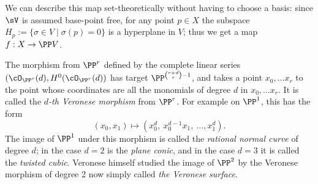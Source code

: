 We can describe this map set-theoretically without having to choose a basis: since $\sV$ is assumed base-point free, for any point $p \in X$ the subspace $H_p := \{ \sigma \in V \mid \sigma(p) = 0 \}$ is a hyperplane in $V$; thus we get a map $f : X \to \PP V$.


%
%
%
%

\begin{example}\label{Veronese definition}
The morphism from $\PP^r$ defined by the complete linear series $(\cO_{\PP^r}(d), H^0(\cO_{\PP^r}(d))$ has target
$\PP^{{r+d\choose r}-1}$, and takes a point $x_0,\dots x_r$ to the point whose coordinates are all the monomials of
degree $d$ in $x_0,\dots x_r$. It is called the \emph{$d$-th Veronese morphism} from $\PP^r$. For example on $\PP^1$, this has the form
$$
(x_0,x_1) \mapsto (x_0^d,\ x_0^{d-1}x_1,\ \dots,x_1^d).
$$
The image of $\PP^1$ under this morphism is called the \emph{rational normal curve} of degree $d$; in the case $d=2$ is the
\emph{plane conic}, and in the case $d=3$ it is called the \emph{twisted cubic}. Veronese himself studied the image of $\PP^2$
by the Veronese morphism of degree 2 now simply called \emph{the Veronese surface}.
\end{example}





